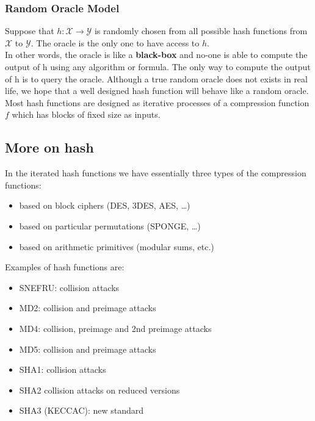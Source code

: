 \documentclass[a4paper, 10pt, titlepage]{article}
\begin{document}
\subsubsection*{Random Oracle Model} 
Suppose that $h : \mathcal{X} \rightarrow \mathcal{Y}$ is randomly chosen from all possible hash functions from $\mathcal{X}$  to $\mathcal{Y}$. The oracle is the only one to have access to $h$. \medskip \\
In other words, the oracle is like a \textbf{black-box} and no-one is able to compute the output of h using any algorithm or formula. The only way to compute the output of h is to query the oracle. Although a true random oracle does not exists in real life, we hope that a well designed hash function will behave like a random oracle. \\
Most hash functions are designed as iterative processes of a compression function $f$ which has blocks of fixed size as inputs.

\subsection{More on hash}
In the iterated hash functions we have essentially three types of the
compression functions:
\begin{itemize}
\item based on block ciphers (DES, 3DES, AES, \dots )
\item based on particular permutations (SPONGE, \dots )
\item based on arithmetic primitives (modular sums, etc.)
\end{itemize}
Examples of hash functions are:
\begin{itemize}
\item SNEFRU: collision attacks
\item MD2: collision and preimage attacks
\item MD4: collision, preimage and 2nd preimage attacks
\item MD5: collision and preimage attacks
\item SHA1: collision attacks
\item SHA2 collision attacks on reduced versions
\item SHA3 (KECCAC): new standard
\end{itemize}
\end{document}
